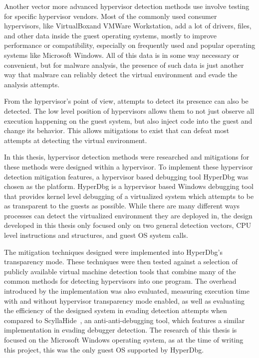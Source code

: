 Another vector more advanced hypervisor detection methods use involve testing for specific hypervisor vendors. Most of the commonly used consumer hypervisors, like VirtualBox\texttrademark and VMWare Workstation\texttrademark, 
add a lot of drivers, files, and other data inside the guest operating systems, mostly to improve performance or compatibility, especially on frequently used and popular operating systems like Microsoft Windows. 
All of this data is in some way necessary or convenient, but for malware analysis, the presence of such data is just another way that malware can reliably detect the virtual environment and evade the analysis attempts.

From the hypervisor's point of view, attempts to detect its presence can also be detected. The low level position of hypervisors allows them to not just observe all execution happening on the guest system, 
but also inject code into the guest and change its behavior. This allows mitigations to exist that can defeat most attempts at detecting the virtual environment.

In this thesis, hypervisor detection methods were researched and mitigations for these methods were designed within a hypervisor. To implement these hypervisor detection mitigation features, 
a hypervisor based debugging tool HyperDbg was chosen as the platform. HyperDbg is a hypervisor based Windows debugging tool that provides kernel level debugging of a virtualized system which attempts to be as transparent to the guests as possible.
While there are many different ways processes can detect the virtualized environment they are deployed in, the design developed in this thesis only focused only on two general detection vectors, 
CPU level instructions and structures, and guest OS system calls.

The mitigation techniques designed were implemented into HyperDbg's transparency mode. 
These techniques were then tested against a selection of publicly available virtual machine detection tools that combine many of the common methods for detecting hypervisors into one program. 
The overhead introduced by the implementation was also evaluated, measuring execution time with and without hypervisor transparency mode enabled, as well as evaluating the efficiency of the 
designed system in evading detection attempts when compared to ScyllaHide~\cite{scyllahide}, an anti-anti-debugging tool, which features a similar implementation in evading debugger detection.
The research of this thesis is focused on the Microsoft Windows operating system, as at the time of writing this project, this was the only guest OS supported by HyperDbg.

